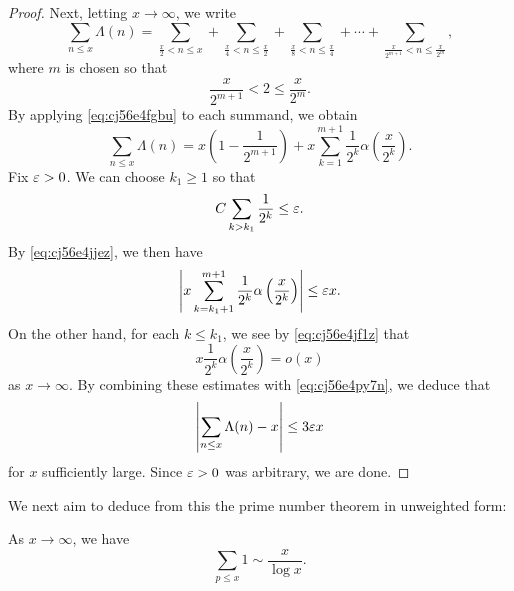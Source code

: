 \documentclass[reqno]{amsart}  \numberwithin{theorem}{section} \numberwithin{equation}{section}
\begin{document}
\begin{proof}
  Next, letting $x \rightarrow \infty$, we write
  \begin{equation*}
    \sum_{n \leq x} \Lambda(n) =
    \sum_{\frac{x}{2} < n \leq x}
    + \sum_{\frac{x}{4} < n \leq \frac{x}{2}}
    + \sum_{\frac{x}{8} < n \leq \frac{x}{4}} + \dotsb + \sum_{\frac{x}{2^{m+1}} < n \leq \frac{x}{2^m }},
  \end{equation*}
  where $m$ is chosen so that
  \begin{equation}\label{eq:cj56e4py7n}
    \frac{x}{2^{m + 1}} < 2 \leq \frac{x}{2^m}.
  \end{equation}
  By applying \eqref{eq:cj56e4fgbu} to each summand, we obtain
  \begin{equation*}
    \sum_{n \leq x } \Lambda (n) = x \left( 1 - \frac{1}{2^{m + 1}} \right)
    +
    x \sum_{k = 1}^{m + 1} \frac{1}{2^k} \alpha \left( \frac{x}{ 2^k } \right).    
  \end{equation*}
  Fix $\varepsilon > 0$.  We can choose $k_1 \geq 1$ so that
  \begin{equation*}
    C \sum_{k > k_1} \frac{1}{2^k } \leq \varepsilon.
  \end{equation*}
  By \eqref{eq:cj56e4jjez}, we then have
  \begin{equation*}
    \left\lvert x \sum_{k = k_1 + 1}^{m + 1} \frac{1}{2^k} \alpha \left( \frac{x}{ 2^k } \right) \right\rvert
    \leq \varepsilon x.
  \end{equation*}
  On the other hand, for each $k \leq k_1$, we see by \eqref{eq:cj56e4jf1z} that
  \begin{equation*}
    x \frac{1}{2^k } \alpha \left( \frac{x}{2^k } \right) =o(x)
  \end{equation*}
  as $x \rightarrow \infty$.  By combining these estimates with \eqref{eq:cj56e4py7n}, we deduce that
  \begin{equation*}
    \left\lvert \sum_{n \leq x} \Lambda (n) - x \right\rvert \leq 3 \varepsilon x
  \end{equation*}
  for $x$ sufficiently large.  Since $\varepsilon > 0$ was arbitrary, we are done.
\end{proof}

We next aim to deduce from this the prime number theorem in unweighted form:
\begin{theorem}\label{theorem:cj56e5hrdh}
  As $x \rightarrow \infty$, we have
  \begin{equation*}
    \sum_{p \leq x} 1 \sim \frac{x}{\log x}.
  \end{equation*}
\end{theorem}
\end{document}
